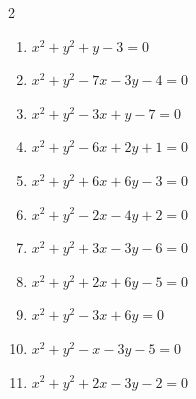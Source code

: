 \begin{multicols}{2}
\begin{enumerate}
  \item $x^{2}+y^{2}+y-3=0$


  \item $x^{2}+y^{2}-7x-3y-4=0$


  \item $x^{2}+y^{2}-3x+y-7=0$


  \item $x^{2}+y^{2}-6x+2y+1=0$

        \phantom{$\displaystyle 中心\: \left(3,-1\right), \quad 半径 \ 3$}

  \item $x^{2}+y^{2}+6x+6y-3=0$


\columnbreak %

  \item $x^{2}+y^{2}-2x-4y+2=0$


  \item $x^{2}+y^{2}+3x-3y-6=0$


  \item $x^{2}+y^{2}+2x+6y-5=0$


  \item $x^{2}+y^{2}-3x+6y=0$


  \item $x^{2}+y^{2}-x-3y-5=0$


  \item $x^{2}+y^{2}+2x-3y-2=0$


\end{enumerate}
\end{multicols}
